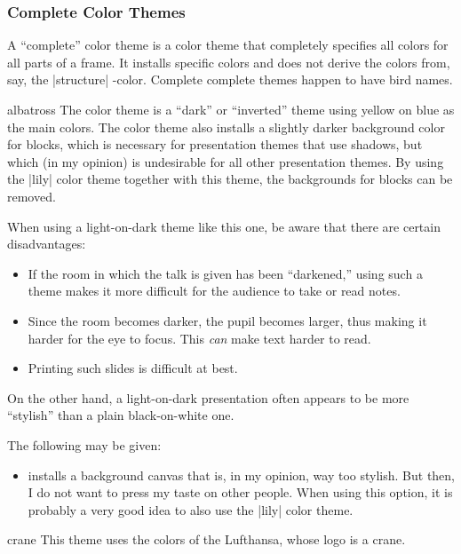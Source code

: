 \subsubsection{Complete Color Themes}

A ``complete'' color theme is a color theme that completely specifies
all colors for all parts of a frame. It installs specific colors and
does not derive the colors from, say, the |structure| \beamer-color.
Complete complete themes happen to have bird names.

\begin{colorthemeexample}{albatross}
  The color theme is a ``dark'' or ``inverted'' theme using yellow on
  blue as the main colors. The color theme also installs a slightly
  darker background color for blocks, which is necessary for
  presentation themes that use shadows, but which (in my opinion) is
  undesirable for all other presentation themes. By using the |lily|
  color theme together with this theme, the backgrounds for blocks can
  be removed.

  When using a light-on-dark theme like this one, be aware that there
  are certain disadvantages:
  \begin{itemize}
  \item
    If the room in which the talk is given has been ``darkened,''
    using such a theme makes it more difficult for the audience to
    take or read notes.
  \item
    Since the room becomes darker, the pupil becomes larger, thus
    making it harder for the eye to focus. This \emph{can} make text
    harder to  read.
  \item
    Printing such slides is difficult at best.
  \end{itemize}

  On the other hand, a light-on-dark presentation often appears to be
  more ``stylish''  than a plain black-on-white one.

  The following  may be given:
  \begin{itemize}
    \item {} installs a background canvas that
      is, in my opinion, way too stylish. But then, I do not want
      to press my taste on other people. When using this option, it is
      probably a very good idea to also use the |lily| color theme.      
  \end{itemize}
\end{colorthemeexample}


\begin{colorthemeexample}{crane}
  This theme uses the colors of the Lufthansa, whose logo is a crane.
\end{colorthemeexample}



